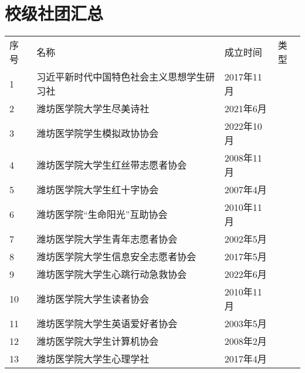 \chapter[校级社团汇总]{校级社团汇总}
\label{community_summary}
\begin{table}[H]
    \centering
    \vspace{8em}
    \noindent\begin{tabular}{|>{\centering\arraybackslash}p{2em}|>{\centering\arraybackslash}p{21em}|%
        >{\centering\arraybackslash}p{6em}|>{\centering\arraybackslash}p{5em}|}
        \Xhline{1.2pt}
        序号 & 名称                    & 成立时间     & 类型                     \\
        \Xhline{1.2pt}
        1  & 习近平新时代中国特色社会主义思想学生研习社 & 2017年11月 & \multirow{3}{*}{思想政治类} \\
        \cline{1-3}
        2  & 潍坊医学院大学生尽美诗社          & 2021年6月  &                        \\
        \cline{1-3}
        3  & 潍坊医学院学生模拟政协协会         & 2022年10月 &                        \\
        \Xhline{1.2pt}
        4  & 潍坊医学院大学生红丝带志愿者协会      & 2008年11月 & \multirow{6}{*}{志愿公益类} \\
        \cline{1-3}
        5  & 潍坊医学院大学生红十字协会         & 2007年4月  &                        \\
        \cline{1-3}
        6  & 潍坊医学院“生命阳光”互助协会       & 2010年11月 &                        \\
        \cline{1-3}
        7  & 潍坊医学院大学生青年志愿者协会       & 2002年5月  &                        \\
        \cline{1-3}
        8  & 潍坊医学院大学生信息安全志愿者协会     & 2017年5月  &                        \\
        \cline{1-3}
        9  & 潍坊医学院大学生心跳行动急救协会      & 2022年6月  &                        \\
        \Xhline{1.2pt}
        10 & 潍坊医学院大学生读者协会          & 2010年11月 & \multirow{5}{*}{学术科技类} \\
        \cline{1-3}
        11 & 潍坊医学院大学生英语爱好者协会       & 2003年5月  &                        \\
        \cline{1-3}
        12 & 潍坊医学院大学生计算机协会         & 2008年2月  &                        \\
        \cline{1-3}
        13 & 潍坊医学院大学生心理学社          & 2017年4月  &                        \\

\end{tabular}
\end{table}
